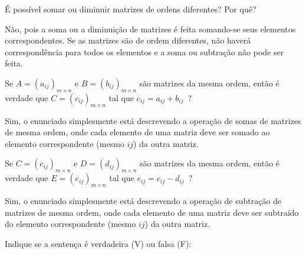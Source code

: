 \documentclass[pdftex, brazil, 12pt, oneside, addpoints]{exam}
\newcommand{\vf}[1][{}]{%
  \fillin[#1][0.25in]%
}
\begin{document}
\begin{questions}
\question
É possível somar ou diminuir matrizes de ordens diferentes? Por quê?
\begin{solutionorlines}[0.50in]
  Não, pois a soma ou a diminuição de matrizes é feita somando-se seus
  elementos correspondentes. Se as matrizes são de ordem diferentes, não
  haverá correspondência para todos os elementos e a soma ou subtração
  não pode ser feita.
\end{solutionorlines}

\question
Se $A = (a_{ij})_{m \times n}$ e $B = (b_{ij})_{m \times n}$ são matrizes
da mesma ordem, então é verdade que $C = (c_{ij})_{m \times n}$ tal que
$c_{ij} = a_{ij} + b_{ij}$\ ?
\begin{solutionorlines}[0.50in]
  Sim, o enunciado simplesmente está descrevendo a operação de somas de matrizes
  de mesma ordem, onde cada elemento de uma matriz deve ser somado ao elemento
  correspondente (mesmo $ij$) da outra matriz.
\end{solutionorlines}

\question
Se $C = (c_{ij})_{m \times n}$ e $D = (d_{ij})_{m \times n}$ são matrizes
da mesma ordem, então é verdade que $E = (e_{ij})_{m \times n}$ tal que
$e_{ij} = c_{ij} - d_{ij}$\ ?
\begin{solutionorlines}[0.50in]
  Sim, o enunciado simplesmente está descrevendo a operação de subtração de matrizes
  de mesma ordem, onde cada elemento de uma matriz deve ser subtraído do elemento
  correspondente (mesmo $ij$) da outra matriz.
\end{solutionorlines}

\question
Indique se a sentença é verdadeira (V) ou falsa (F):
\end{questions}
\end{document}
